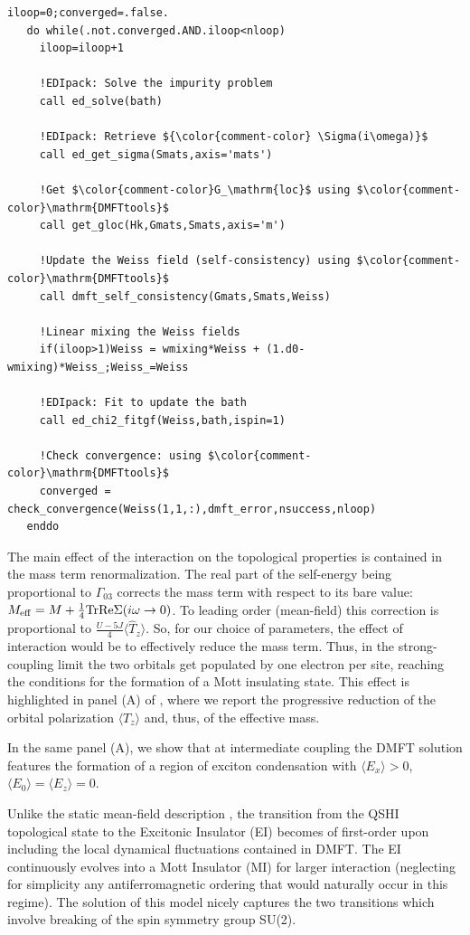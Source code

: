 \documentclass[edipack_sp.tex]{subfiles}
\begin{document}
\begin{lstlisting}[style=fstyle,numbers=none,basicstyle={\scriptsize\ttfamily}]
   iloop=0;converged=.false.
   do while(.not.converged.AND.iloop<nloop)
     iloop=iloop+1
     
     !EDIpack: Solve the impurity problem
     call ed_solve(bath)

     !EDIpack: Retrieve ${\color{comment-color} \Sigma(i\omega)}$
     call ed_get_sigma(Smats,axis='mats')
     
     !Get $\color{comment-color}G_\mathrm{loc}$ using $\color{comment-color}\mathrm{DMFTtools}$
     call get_gloc(Hk,Gmats,Smats,axis='m')
     
     !Update the Weiss field (self-consistency) using $\color{comment-color}\mathrm{DMFTtools}$
     call dmft_self_consistency(Gmats,Smats,Weiss)

     !Linear mixing the Weiss fields
     if(iloop>1)Weiss = wmixing*Weiss + (1.d0-wmixing)*Weiss_;Weiss_=Weiss

     !EDIpack: Fit to update the bath
     call ed_chi2_fitgf(Weiss,bath,ispin=1)
     
     !Check convergence: using $\color{comment-color}\mathrm{DMFTtools}$
     converged = check_convergence(Weiss(1,1,:),dmft_error,nsuccess,nloop)
   enddo  
\end{lstlisting}

%
The main effect of the interaction on the topological properties is contained in the mass term renormalization.  
The real part of the self-energy being proportional to $\Gamma_{03}$
corrects the mass term with respect to its bare value: $M_\mathrm{eff}=M+\tfrac{1}{4}{\rm Tr}{{\rm Re}\Sigma(i\omega\to0)}$. 
To leading order (mean-field) this correction is proportional to $\tfrac{U-5J}{4}\langle
\hat{T}_z\rangle$. So, for our choice of parameters, the effect of
interaction would be to effectively reduce the mass term. Thus, in the strong-coupling limit the two orbitals get populated by one electron per site, reaching the
conditions for the formation of a Mott insulating state.
This effect is highlighted in panel (A) of , where we report the progressive reduction of the
orbital polarization  $\langle T_z\rangle$ and, thus, of the effective mass. 


In the same panel (A), we show that at intermediate coupling 
the DMFT solution features the formation of a
region of exciton condensation with $\langle E_x\rangle>0$, $\langle
E_0\rangle=\langle E_z\rangle=0$. 

Unlike the static mean-field description \cite{Blason2020PRB}, the
transition from the QSHI topological state to the Excitonic Insulator 
(EI) becomes of first-order upon including the local dynamical fluctuations \cite{Paoletti2024PRB,BellomiaKMH} contained in DMFT. 
The EI continuously evolves into a Mott Insulator (MI)
for larger interaction (neglecting for simplicity any 
antiferromagnetic ordering that would naturally occur in this
regime).
The \NAME solution of this model nicely captures the two transitions which involve breaking of the spin symmetry group SU(2). 
\end{document}
